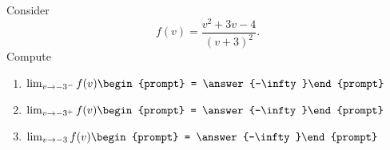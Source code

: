 \documentclass{ximera}
\author{Bart Snapp}
\begin{document}
\begin{exercise}
Consider 
\[
f(v) = \frac{v^2+3 v-4}{(v+3)^2}.
\]
Compute
\begin{enumerate}
\item $\lim_{v\to -3^- } f(v) \begin{prompt} = \answer{-\infty}\end{prompt}$
\item $\lim_{v\to -3^+ } f(v) \begin{prompt} = \answer{-\infty}\end{prompt}$
\item $\lim_{v\to -3 } f(v) \begin{prompt} = \answer{-\infty}\end{prompt}$
\end{enumerate}
\end{exercise}
\end{document}
